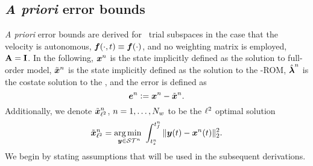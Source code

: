 %

\subsection{\textit{A priori} error bounds}
\textit{A priori} error bounds are derived for \spatialAcronym\ trial subspaces in the case that the velocity is autonomous, $\boldsymbol f(\cdot,t) \equiv \boldsymbol f(\cdot)$, and no weighting matrix is employed, $\mathbf{A} = \mathbf{I}$.
In the following,  ${\boldsymbol x}^{n}$ is the state implicitly defined as the solution to full-order model, $\tilde{\boldsymbol x}^{n}$ is the state implicitly defined as the solution to the \methodAcronym-ROM, $\hat{\boldsymbol \lambda}^{n}$ is the costate solution to the \methodAcronymROM, and the error is defined as
$$\boldsymbol e^{n} \vcentcolon= {\boldsymbol x}^{n} - \tilde{\boldsymbol x}^{n}.$$
Additionally, we denote $\tilde{\boldsymbol x}_{\ell^2}^{n}$, $n=1,\ldots,N_w$ to be the $\ell^2$ optimal solution
$$\tilde{\boldsymbol x}_{\ell^2}^{n} = \underset{\boldsymbol y \in
\mathcal{ ST }^n}{\text{arg}\,\text{min } } \int_{t_s^{n}}^{t_f^{n}} \|  \boldsymbol y(t) - {\boldsymbol x}^{n}(t)  \|_2^2.$$ 
We begin by stating assumptions that will be used in the subsequent derivations.

